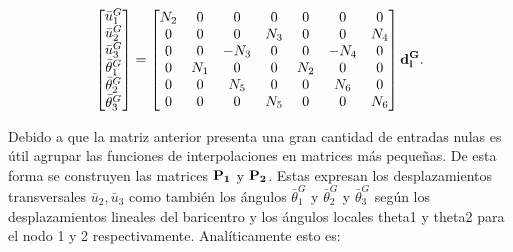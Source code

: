 \begin{equation}\label{Eqn:PRE:LocalDispsTransform}
	\begin{bmatrix}
		\bar{u}_1^G\\
		\bar{u}_2^G\\
		\bar{u}_3^G\\
		 \bar{\theta}_1^G\\
		 \bar{\theta}_2^G\\
		 \bar{\theta}_3^G\\
	\end{bmatrix}
=
\begin{bmatrix}
	N_2 &0  & 0 & 0 & 0 & 0 & 0   \\
	0 & 0 & 0 & N_3 & 0 &0  &N_4  \\
	0& 0 &-N_3  & 0 &0  & -N_4 &0 \\
	0 & N_1 & 0 & 0 &N_2  & 0 &0   \\
	0&0  & N_5 & 0 & 0 & N_6 &0   \\
	0 & 0 & 0 & N_5 & 0 & 0 & N_6   \\
\end{bmatrix} \bf{d_l^G}.
\end{equation}

Debido a que la matriz anterior presenta una gran cantidad de entradas nulas es útil agrupar las funciones de interpolaciones en matrices más pequeñas. De esta forma se construyen las matrices $\bf{P_1}$ y $\bf{P_2}$.  Estas expresan los desplazamientos transversales  $\bar{u}_2, \bar{u}_3 $  como también los ángulos $\bar{\theta}_1^G$  y $\bar{\theta}_2^G$ y $\bar{\theta}_3^G$ según los desplazamientos lineales del baricentro y los ángulos locales  \gls{theta1} y  \gls{theta2} para el nodo 1 y 2 respectivamente. Analíticamente esto es:


